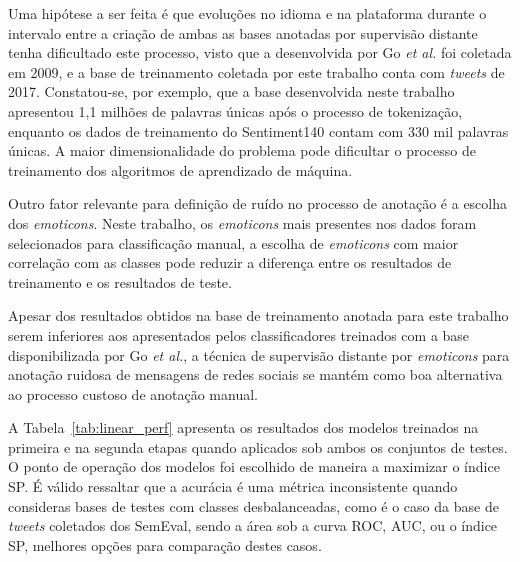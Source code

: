 Uma hipótese a ser feita é que evoluções no idioma e na plataforma durante o intervalo entre a criação de ambas as
bases anotadas por supervisão distante tenha dificultado este processo, visto que a desenvolvida por Go \textit{et al.}
foi coletada em 2009, e a base de treinamento coletada por este trabalho conta com \textit{tweets} de 2017.
Constatou-se, por exemplo, que a base desenvolvida neste trabalho apresentou 1,1 milhões de palavras únicas após o
processo de tokenização, enquanto os dados de treinamento do Sentiment140 contam com 330 mil palavras únicas.
A maior dimensionalidade do problema pode dificultar o processo de treinamento dos algoritmos de aprendizado de máquina.

Outro fator relevante para definição de ruído no processo de anotação é a escolha dos \textit{emoticons}.
Neste trabalho, os \textit{emoticons} mais presentes nos dados foram selecionados para classificação manual, a escolha
de \textit{emoticons} com maior correlação com as classes pode reduzir a diferença entre os resultados de treinamento e
os resultados de teste.

Apesar dos resultados obtidos na base de treinamento anotada para este trabalho serem inferiores aos apresentados pelos
classificadores treinados com a base disponibilizada por Go \textit{et al.}, a técnica de supervisão distante por
\textit{emoticons} para anotação ruidosa de mensagens de redes sociais se mantém como boa alternativa ao processo
custoso de anotação manual.

A Tabela~\ref{tab:linear_perf} apresenta os resultados dos modelos treinados na primeira e na segunda etapas quando
aplicados sob ambos os conjuntos de testes.
O ponto de operação dos modelos foi escolhido de maneira a maximizar o índice SP.
É válido ressaltar que a acurácia é uma métrica inconsistente quando consideras bases de testes com classes
desbalanceadas, como é o caso da base de \textit{tweets} coletados dos SemEval, sendo a área sob a curva ROC, AUC, ou o
índice SP, melhores opções para comparação destes casos.


